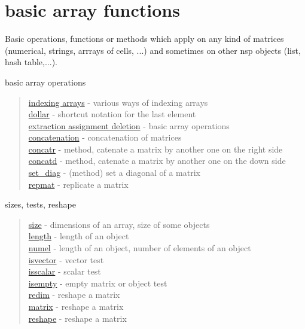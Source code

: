 \chapter*{basic array functions}

\hypertarget{arrays}{}

Basic operations, functions or methods which apply on any kind of matrices 
(numerical, strings, arrrays of cells, ...) and sometimes on other 
nsp objects (list, hash table,...).

basic array operations

\begin{quote}
\noindent
\hyperlink{indexing arrays}{indexing arrays} - various ways of indexing arrays \\
\hyperlink{dollar}{dollar} - shortcut notation for the last element\\
\hyperlink{extraction assignment deletion}{extraction assignment deletion} - basic array operations\\
\hyperlink{concatenation}{concatenation} - concatenation of matrices\\
\hyperlink{concatr}{concatr} - method, catenate a matrix by another one on the right side\\   
\hyperlink{concatd}{concatd} - method, catenate a matrix by another one on the down side\\   
\hyperlink{set_diag}{set\_diag} - (method) set a diagonal of a matrix \\
\hyperlink{repmat}{repmat} - replicate a matrix\\
\end{quote}


sizes, tests, reshape 

\begin{quote}
\noindent
\hyperlink{size}{size} - dimensions of an array, size of some objects \\
\hyperlink{length}{length} - length of an object  \\
\hyperlink{numel}{numel} - length of an object, number of elements of an object  \\
\hyperlink{isvector}{isvector} - vector test\\
\hyperlink{isscalar}{isscalar} - scalar test\\
\hyperlink{isempty}{isempty} - empty matrix or object test\\
\hyperlink{redim}{redim} - reshape a matrix\\
\hyperlink{matrix}{matrix} - reshape a matrix\\
\hyperlink{reshape}{reshape} - reshape a matrix\\
\end{quote}


